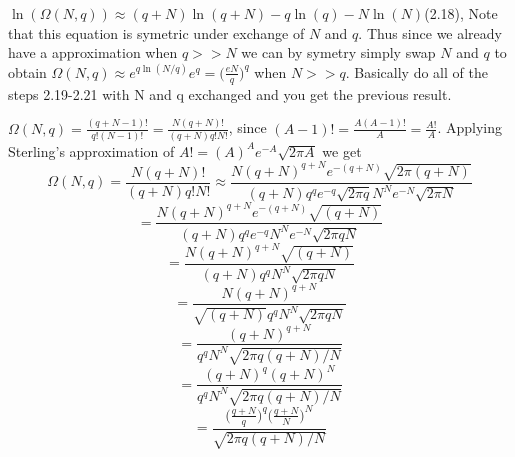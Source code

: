 \documentclass[12pt]{article}
\makeatletter
\theoremstyle{homework}
\newenvironment{exercise}[1]
{\def\@currentlabel{#1}\exercisecore}
{\endexercisecore}
\makeatother
\begin{document}
\begin{exercise}{2.17}
$\ln(\Omega(N,q))\approx (q+N)\ln(q+N)-q\ln(q)-N\ln(N)$(2.18), Note that this equation is symetric under exchange of $N$ and $q$.  Thus since we already have a approximation when $q>>N$ we can by symetry simply swap $N$ and $q$ to obtain $\Omega(N,q)\approx e^{q\ln(N/q)}e^q=\biggr (\frac{eN}{q}\biggr)^q$ when $N>>q$.  Basically do all of the steps 2.19-2.21 with N and q exchanged and you get the previous result.
\end{exercise}

\begin{exercise}{2.18}
$\Omega(N,q)=\frac{(q+N-1)!}{q!(N-1)!}= \frac{N(q+N)!}{(q+N)q!N!}$, since $(A-1)!=\frac{A(A-1)!}{A}=\frac{A!}{A}$.  Applying Sterling's approximation of $A!=(A)^{A}e^{-A}\sqrt{2\pi A}$ we get $$\Omega(N,q)=\frac{N(q+N)!}{(q+N)q!N!}\approx\frac{N(q+N)^{q+N}e^{-(q+N)}\sqrt{2\pi (q+N)}}{(q+N)q^qe^{-q}\sqrt{2\pi q}N^Ne^{-N}\sqrt{2\pi N}}$$
$$=\frac{N(q+N)^{q+N}e^{-(q+N)}\sqrt{(q+N)}}{(q+N)q^qe^{-q}N^Ne^{-N}\sqrt{2\pi qN}}$$
$$=\frac{N(q+N)^{q+N}\sqrt{(q+N)}}{(q+N)q^qN^N\sqrt{2\pi qN}}$$
$$=\frac{N(q+N)^{q+N}}{\sqrt{(q+N)}q^qN^N\sqrt{2\pi qN}}$$
$$=\frac{(q+N)^{q+N}}{q^qN^N\sqrt{2\pi q(q+N) /N}}$$
$$=\frac{(q+N)^q(q+N)^N}{q^qN^N\sqrt{2\pi q(q+N) /N}}$$
$$=\frac{\biggr(\frac{q+N}{q}\biggr)^q\biggr(\frac{q+N}{N}\biggr)^N}{\sqrt{2\pi q(q+N) /N}}$$
\end{exercise}
\end{document}
